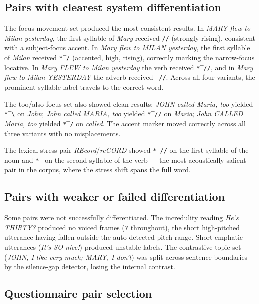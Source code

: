 \subsection{Pairs with clearest system differentiation}

The focus-movement set produced the most consistent results. In \textit{MARY
flew to Milan yesterday}, the first syllable of \textit{Mary} received
\texttt{//} (strongly rising), consistent with a subject-focus accent. In
\textit{Mary flew to MILAN yesterday}, the first syllable of \textit{Milan}
received \texttt{*‾/} (accented, high, rising), correctly marking the
narrow-focus locative. In \textit{Mary FLEW to Milan yesterday} the verb
received \texttt{*‾//}, and in \textit{Mary flew to Milan YESTERDAY} the
adverb received \texttt{‾//}. Across all four variants, the prominent
syllable label travels to the correct word.

The too/also focus set also showed clean results: \textit{JOHN called Maria,
too} yielded \texttt{*‾\textbackslash} on \textit{John}; \textit{John called
MARIA, too} yielded \texttt{*‾//} on \textit{Maria}; \textit{John CALLED
Maria, too} yielded \texttt{*‾/} on \textit{called}. The accent marker moved
correctly across all three variants with no misplacements.

The lexical stress pair \textit{REcord}/\textit{reCORD} showed \texttt{*‾//}
on the first syllable of the noun and \texttt{*‾} on the second syllable of
the verb --- the most acoustically salient pair in the corpus, where the
stress shift spans the full word.

\subsection{Pairs with weaker or failed differentiation}

Some pairs were not successfully differentiated. The incredulity reading
\textit{He's THIRTY?} produced no voiced frames (\texttt{?} throughout), the
short high-pitched utterance having fallen outside the auto-detected pitch
range. Short emphatic utterances (\textit{It's SO nice!}) produced unstable
labels. The contrastive topic set (\textit{JOHN, I like very much; MARY, I
don't}) was split across sentence boundaries by the silence-gap detector,
losing the internal contrast.

\subsection{Questionnaire pair selection}

